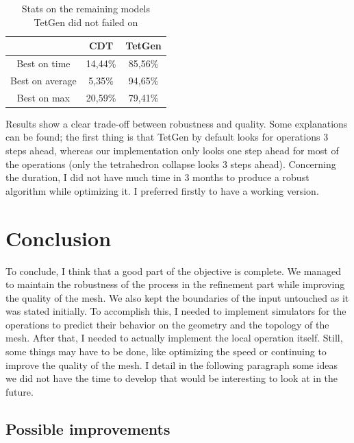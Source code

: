 \documentclass[11pt]{article}
\begin{document}
\begin{table}[!htb]
	\centering
	\begin{tabular}{c|c|c}
		                & CDT     & TetGen  \\
		\hline
		Best on time    & 14,44\% & 85,56\% \\
		Best on average & 5,35\%  & 94,65\% \\
		Best on max     & 20,59\% & 79,41\%
	\end{tabular}
	\caption{Stats on the remaining models TetGen did not failed on}
\end{table}

Results show a clear trade-off between robustness and quality. Some explanations can be found; the first thing is that TetGen by default looks for operations 3 steps ahead, whereas our implementation only looks one step ahead for most of the operations (only the tetrahedron collapse looks 3 steps ahead). Concerning the duration, I did not have much time in 3 months to produce a robust algorithm while optimizing it. I preferred firstly to have a working version.

\section{Conclusion}

To conclude, I think that a good part of the objective is complete. We managed to maintain the robustness of the process in the refinement part while improving the quality of the mesh. We also kept the boundaries of the input untouched as it was stated initially. To accomplish this, I needed to implement simulators for the operations to predict their behavior on the geometry and the topology of the mesh. After that, I needed to actually implement the local operation itself. Still, some things may have to be done, like optimizing the speed or continuing to improve the quality of the mesh. I detail in the following paragraph some ideas we did not have the time to develop that would be interesting to look at in the future.

\subsection*{Possible improvements}
\end{document}
